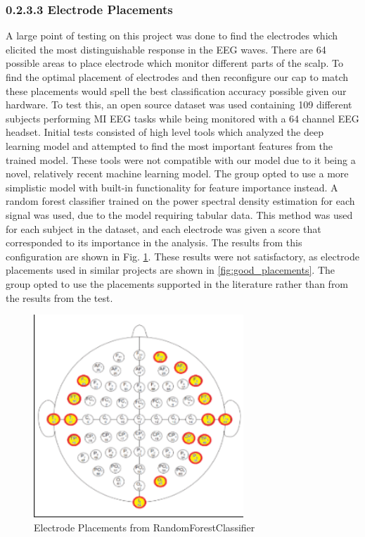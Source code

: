 \documentclass[conference]{IEEEtran}
\begin{document}
        \subsubsection{0.2.3.3 Electrode Placements}
        A large point of testing on this project was done to find the electrodes which elicited the most distinguishable response in the EEG waves. There are 64 possible areas to place electrode which monitor different parts of the scalp. To find the optimal placement of electrodes and then reconfigure our cap to match these placements would spell the best classification accuracy possible given our hardware. To test this, an open source dataset was used containing 109 different subjects performing MI EEG tasks while being monitored with a 64 channel EEG headset. Initial tests consisted of high level tools which analyzed the deep learning model and attempted to find the most important features from the trained model. These tools were not compatible with our model due to it being a novel, relatively recent machine learning model. The group opted to use a more simplistic model with built-in functionality for feature importance instead. A random forest classifier trained on the power spectral density estimation for each signal was used, due to the model requiring tabular data. This method was used for each subject in the dataset, and each electrode was given a score that corresponded to its importance in the analysis. The results from this configuration are shown in Fig. \ref{fig:bad_placements}. These results were not satisfactory, as electrode placements used in similar projects are shown in \ref{fig:good_placements}. The group opted to use the placements supported in the literature rather than from the results from the test.  
        \begin{figure}[htbp]
            \centering
            \includegraphics[keepaspectratio, height=3in]{figs/paper/bad_placements.png}
            \caption{Electrode Placements from RandomForestClassifier}
            \label{fig:bad_placements}
        \end{figure}
\end{document}

